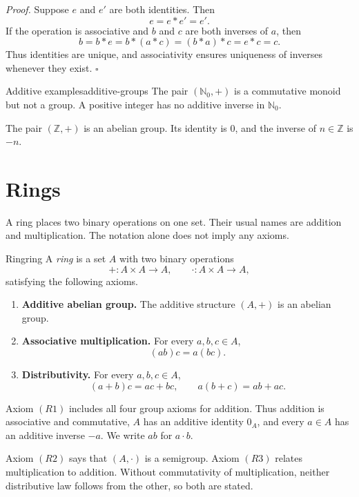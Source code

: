 \documentclass[10pt,a4paper]{article}
\newcommand{\Z}{\mathbb{Z}}
\newcommand{\N}{\mathbb{N}}
\begin{document}
\textit{Proof.}
Suppose $e$ and $e'$ are both identities. Then
\[
  e=e\ast e'=e'.
\]
If the operation is associative and $b$ and $c$ are both inverses of $a$, then
\[
  b=b\ast e
   =b\ast(a\ast c)
   =(b\ast a)\ast c
   =e\ast c=c.
\]
Thus identities are unique, and associativity ensures uniqueness of inverses
whenever they exist.
\hfill$\square$

\begin{examplebox}{Additive examples}{additive-groups}
The pair $(\N_0,+)$ is a commutative monoid but not a group. A positive integer
has no additive inverse in $\N_0$.

The pair $(\Z,+)$ is an abelian group. Its identity is $0$, and the inverse of
$n\in\Z$ is $-n$.
\end{examplebox}

\section{Rings}

A ring places two binary operations on one set. Their usual names are addition
and multiplication. The notation alone does not imply any axioms.

\begin{definition}{Ring}{ring}
A \emph{ring} is a set $A$ with two binary operations
\[
  +:A\times A\longrightarrow A,
  \qquad
  \cdot:A\times A\longrightarrow A,
\]
satisfying the following axioms.
\begin{enumerate}[label=\textup{(R\arabic*)}]
  \item \textbf{Additive abelian group.} The additive structure $(A,+)$ is
  an abelian group.

  \item \textbf{Associative multiplication.} For every $a,b,c\in A$,
  \[
    (ab)c=a(bc).
  \]

  \item \textbf{Distributivity.} For every $a,b,c\in A$,
  \[
    (a+b)c=ac+bc,
    \qquad
    a(b+c)=ab+ac.
  \]
\end{enumerate}
\end{definition}

Axiom $(R1)$ includes all four group axioms for addition. Thus addition is
associative and commutative, $A$ has an additive identity $0_A$, and every
$a\in A$ has an additive inverse $-a$. We write $ab$ for $a\cdot b$.

Axiom $(R2)$ says that $(A,\cdot)$ is a semigroup. Axiom $(R3)$ relates
multiplication to addition. Without commutativity of multiplication, neither
distributive law follows from the other, so both are stated.
\end{document}
